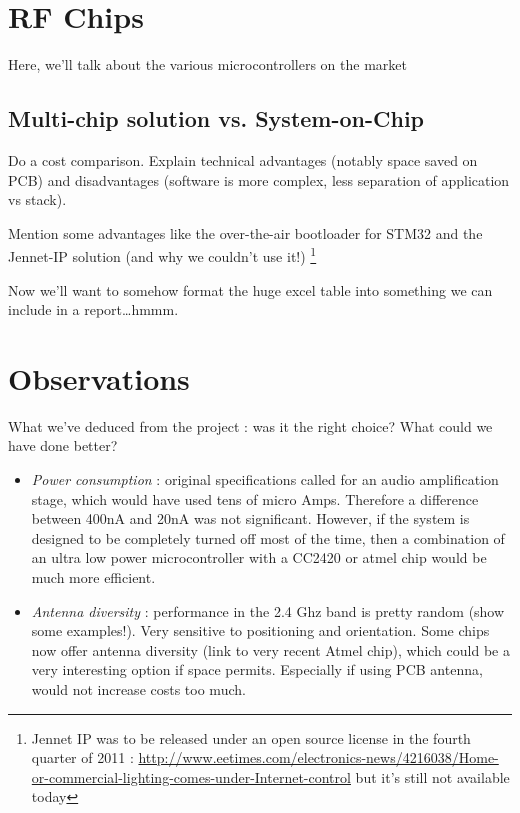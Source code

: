\section{RF Chips}\label{sec:chips}

Here, we'll talk about the various microcontrollers on the market

\subsection{Multi-chip solution vs. System-on-Chip}

Do a cost comparison. 
Explain technical advantages (notably space saved on PCB) and disadvantages
(software is more complex, less separation of application vs stack).

Mention some advantages like the over-the-air bootloader for STM32 and the
Jennet-IP solution (and why we couldn't use it!) \footnote{Jennet IP was to be
released under an open source license in the fourth quarter of 2011
: \url{http://www.eetimes.com/electronics-news/4216038/Home-or-commercial-lighting-comes-under-Internet-control}
but it's still not available today}

Now we'll want to somehow format the huge excel table into something we can
include in a report\ldots hmmm.

\section{Observations}

What we've deduced from the project : was it the right choice? What could we
have done better?

\begin{itemize}
  \item \emph{Power consumption} : original specifications called for an audio
    amplification stage, which would have used tens of micro Amps.
    Therefore a difference between 400nA and 20nA was not significant. However,
    if the system is designed to be completely turned off most of the time, then
    a combination of an ultra low power microcontroller with a CC2420 or atmel
    chip would be much more efficient.
  \item \emph{Antenna diversity} : performance in the 2.4 Ghz band is pretty
    random (show some examples!). Very sensitive to positioning and orientation.
    Some chips now offer antenna diversity (link to very recent Atmel chip),
    which could be a very interesting option if space permits. Especially if
    using PCB antenna, would not increase costs too much.
\end{itemize}

